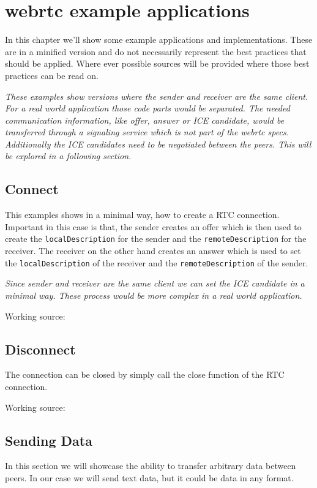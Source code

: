 \clearpage
\chapter{\Gls{webrtc} example applications}
In this chapter we'll show some example applications and implementations. These are in a minified version and do not necessarily represent the best practices that should be applied. Where ever possible sources will be provided where those best practices can be read on.

\textit{These examples show versions where the sender and receiver are the same client. For a real world application those code parts would be separated. The needed communication information, like offer, answer or ICE candidate, would be transferred through a signaling service which is not part of the \Gls{webrtc} specs. Additionally the ICE candidates need to be negotiated between the peers. This will be explored in a following section.}

\section{Connect}
This examples shows in a minimal way, how to create a RTC connection. Important in this case is that, the sender creates an offer which is then used to create the \lstinline[basicstyle=\ttfamily\color{black}]|localDescription| for the sender and the \lstinline[basicstyle=\ttfamily\color{black}]|remoteDescription| for the receiver. The receiver on the other hand creates an answer which is used to set the \lstinline[basicstyle=\ttfamily\color{black}]|localDescription| of the receiver and the \lstinline[basicstyle=\ttfamily\color{black}]|remoteDescription| of the sender.

\textit{Since sender and receiver are the same client we can set the ICE candidate in a minimal way. These process would be more complex in a real world application.}

Working source:~\autocite{webrtc:connect}

\section{Disconnect}
The connection can be closed by simply call the close function of the RTC connection.

Working source:~\autocite{webrtc:disconnect}

\section{Sending Data}
In this section we will showcase the ability to transfer arbitrary data between peers. In our case we will send text data, but it could be data in any format.

